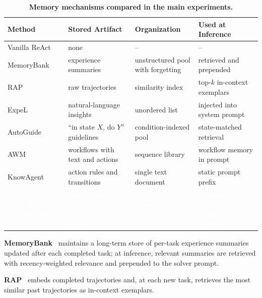 \begin{table}[htbp]
\centering
\scriptsize
\setlength{\aboverulesep}{0pt}
\setlength{\belowrulesep}{0pt}
\renewcommand{\arraystretch}{1.2}
\setlength{\tabcolsep}{3pt}
\caption{\textbf{Memory mechanisms compared in the main experiments.}}
\label{tab:baseline_summary}
\begin{tabular}{l >{\raggedright\arraybackslash}m{3.7cm} >{\raggedright\arraybackslash}m{4cm} >{\raggedright\arraybackslash}m{3.8cm}}
\toprule
\rowcolor{GoogleGreen!15}
\textbf{Method} & \textbf{Stored Artifact} & \textbf{Organization} & \textbf{Used at Inference} \\
\midrule
Vanilla ReAct~\citep{yao2023react} & none & -- & -- \\
MemoryBank~\citep{zhong2024memorybank} & experience summaries & unstructured pool with forgetting & retrieved and prepended \\
RAP~\citep{kagaya2024rap} & raw trajectories & similarity index & top-$k$ in-context exemplars \\
ExpeL~\citep{zhao2024expel} & natural-language insights & unordered list & injected into system prompt \\
AutoGuide~\citep{fu2024autoguide} & ``in state $X$, do $Y$'' guidelines & condition-indexed pool & state-matched retrieval \\
AWM~\citep{wang2025agent} & workflows with text and actions & sequence library & workflow memory in prompt \\
KnowAgent~\citep{zhu2025knowagent} & action rules and transitions & single text document & static prompt prefix \\
\rowcolor{GoogleGreen}
\textcolor{white}{\textbf{Procedural Graph (Ours)}} & \textcolor{white}{\textbf{(procedure, relation, procedure) triplets}} & \textcolor{white}{\textbf{connected graph}} & \textcolor{white}{\textbf{localized subgraph $\rightarrow$ generated guidance}} \\
\bottomrule
\end{tabular}
\end{table}

\textbf{MemoryBank}~\citep{zhong2024memorybank} maintains a long-term store of per-task experience summaries updated after each completed task; at inference, relevant summaries are retrieved with recency-weighted relevance and prepended to the solver prompt.

\textbf{RAP}~\citep{kagaya2024rap} embeds completed trajectories and, at each new task, retrieves the most similar past trajectories as in-context exemplars.

